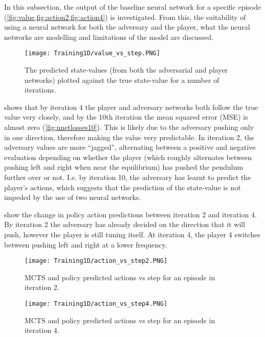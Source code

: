 \documentclass[../main.tex]{subfiles}
\begin{document}
In this subsection, the output of the baseline neural network for a specific episode (\cref{fig:value,fig:action2,fig:action4}) is investigated. From this, the suitability of using a neural network for both the adversary and the player, what the neural networks are modelling and limitations of the model are discussed.

\begin{figure}[H]
    \centering
    \texttt{[image: Training1D/value\_vs\_step.PNG]}
    \caption{The predicted state-values (from both the adversarial and player networks) plotted against the true state-value for a number of iterations.}
    \label{fig:value}
\end{figure}

 shows that by iteration 4 the player and adversary networks both follow the true value very closely, and by the 10th iteration the mean squared error (MSE) is almost zero (\cref{fig:nnetlosses10}). This is likely due to the adversary pushing only in one direction, therefore making the value very predictable. In iteration 2, the adversary values are more ``jagged'', alternating between a positive and negative evaluation depending on whether the player (which roughly alternates between pushing left and right when near the equilibrium) has pushed the pendulum further over or not. I.e. by iteration 10, the adversary has learnt to predict the player's actions, which suggests that the prediction of the state-value is not impeded by the use of two neural networks.

 show the change in policy action predictions between iteration 2 and iteration 4. By iteration 2 the adversary has already decided on the direction that it will push, however the player is still tuning itself. At iteration 4, the player 4 switches between pushing left and right at a lower frequency.

\begin{figure}[h]
    \centering
    \texttt{[image: Training1D/action\_vs\_step2.PNG]}
    \caption{MCTS and policy predicted actions vs step for an episode in iteration 2.}
    \label{fig:action2}
\end{figure}
\begin{figure}[h]
    \centering
    \texttt{[image: Training1D/action\_vs\_step4.PNG]}
    \caption{MCTS and policy predicted actions vs step for an episode in iteration 4.}
    \label{fig:action4}
\end{figure}
\end{document}
